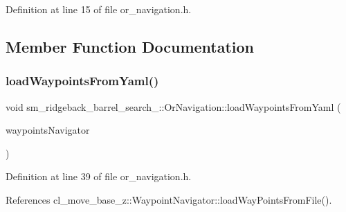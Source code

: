 Definition at line 15 of file or\+\_\+navigation.\+h.



\subsection{Member Function Documentation}
\mbox{\label{classsm__ridgeback__barrel__search__1_1_1OrNavigation_a875df5d1fdcd34f568e6db573dfbaed7}} 
\subsubsection{\texorpdfstring{load\+Waypoints\+From\+Yaml()}{loadWaypointsFromYaml()}}
{\footnotesize\ttfamily void sm\+\_\+ridgeback\+\_\+barrel\+\_\+search\+\_\+::\+Or\+Navigation\+::load\+Waypoints\+From\+Yaml (\begin{DoxyParamCaption}\item[{\hyperlink{classcl__move__base__z_1_1WaypointNavigator}{Waypoint\+Navigator} $\ast$}]{waypoints\+Navigator }\end{DoxyParamCaption})\hspace{0.3cm}{\ttfamily [inline]}}



Definition at line 39 of file or\+\_\+navigation.\+h.



References cl\+\_\+move\+\_\+base\+\_\+z\+::\+Waypoint\+Navigator\+::load\+Way\+Points\+From\+File().


